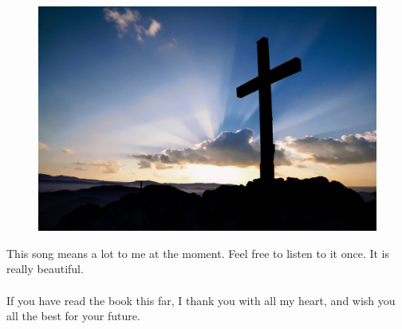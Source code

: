 \documentclass[12pt,a5paper]{article}
\begin{document}
		\begin{figure}[h]
			\centering
			\includegraphics[width=\linewidth,keepaspectratio]{"FreeChristian.jpeg"}
		\end{figure}
		
		This song means a lot to me at the moment.
		Feel free to listen to it once.
		It is really beautiful.
		\\
		\\
		If you have read the book this far,
		I thank you with all my heart,
		and wish you all the best for your future.
		
	
\end{document}
